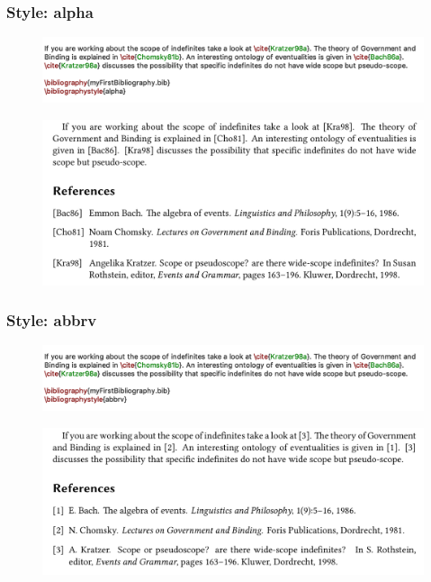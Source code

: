 \begin{frame}[fragile]
\frametitle{Style: alpha}

\begin{figure}
\centering
\includegraphics[width=.85\textwidth]{../../texfiles-beamer/tex-material/WissArb-latex/xelatex-bib-alpha}
\end{figure}

\begin{figure}
\centering
\includegraphics[width=.85\textwidth]{../../texfiles-beamer/tex-material/WissArb-latex/xelatex-bib-alpha-pdf}
\end{figure}

\end{frame}


\begin{frame}[fragile]
\frametitle{Style: abbrv}

\begin{figure}
\centering
\includegraphics[width=.85\textwidth]{../../texfiles-beamer/tex-material/WissArb-latex/xelatex-bib-abbrv}
\end{figure}

\begin{figure}
\centering
\includegraphics[width=.85\textwidth]{../../texfiles-beamer/tex-material/WissArb-latex/xelatex-bib-abbrv-pdf}
\end{figure}

\end{frame}


